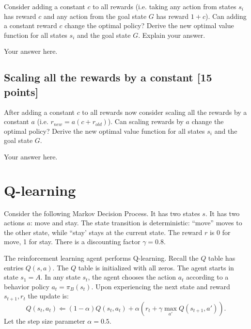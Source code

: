 \documentclass[a4paper]{article}
\theoremstyle{definition}
\begin{document}
	Consider adding a constant $c$ to all rewards (i.e. taking any action from states $s_i$ has reward $c$ and any action from the goal state $G$ has reward $1+c$). Can adding a constant reward $c$ change the optimal policy? Derive the new optimal value function for all states $s_i$ and the goal state $G$.  Explain your answer.
	
	{\color{blue}
		Your answer here.
		
	}
	
\subsection{Scaling all the rewards by a constant [15 points]}	
	After adding a constant $c$ to all rewards now consider scaling all the rewards by a constant $a$ (i.e. $r_{new} = a(c+ r_{old})$). Can scaling rewards by $a$ change the optimal policy?
	Derive the new optimal value function for all states $s_i$ and the goal state $G$.
	
	{\color{blue}
		Your answer here.
	}


\section{Q-learning}
Consider the following Markov Decision Process.
It has two states $s$. It has two actions $a$: move and stay. The state transition is deterministic: ``move'' moves to the other state, while ``stay' stays at the current state. The reward $r$ is 0 for move,  1 for stay. There is a discounting factor $\gamma=0.8$.
\\


The reinforcement learning agent performs Q-learning.  Recall the $Q$ table has entries $Q(s,a)$. The $Q$ table is initialized with all zeros. The agent starts in state $s_1=A$. In any state $s_t$, the agent chooses the action $a_t$ according to a behavior policy $a_t = \pi_B(s_t)$. Upon experiencing the next state and reward $s_{t+1}, r_t$ the update is:
$$Q(s_t, a_t) \Leftarrow (1-\alpha) Q(s_t, a_t) + \alpha \left( r_t + \gamma \max_{a'} Q(s_{t+1}, a') \right).$$
Let the step size parameter $\alpha=0.5$.
\end{document}
